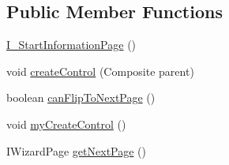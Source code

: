 \subsection*{Public Member Functions}
\begin{DoxyCompactItemize}
\item 
\hyperlink{classit_1_1isislab_1_1masonhelperdocumentation_1_1mason_1_1wizards_1_1_i___start_information_page_a647179e27cb296a79f0e11c8f3a76e85}{I\-\_\-\-Start\-Information\-Page} ()
\item 
void \hyperlink{classit_1_1isislab_1_1masonhelperdocumentation_1_1mason_1_1wizards_1_1_i___start_information_page_aa65c38fd9cc3cba8b288d06a6d3a2511}{create\-Control} (Composite parent)
\item 
boolean \hyperlink{classit_1_1isislab_1_1masonhelperdocumentation_1_1mason_1_1wizards_1_1_i___start_information_page_a7fb3c132afc2de798084871172e088ca}{can\-Flip\-To\-Next\-Page} ()
\item 
void \hyperlink{classit_1_1isislab_1_1masonhelperdocumentation_1_1mason_1_1wizards_1_1_i___start_information_page_a11ff2fb4c6af0ac2cc873e0b56553c55}{my\-Create\-Control} ()
\item 
I\-Wizard\-Page \hyperlink{classit_1_1isislab_1_1masonhelperdocumentation_1_1mason_1_1wizards_1_1_i___start_information_page_af04d37e7abfe04292439e4df5d63ceb8}{get\-Next\-Page} ()
\end{DoxyCompactItemize}

